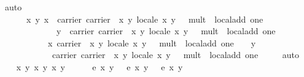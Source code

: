 \begin{isabellebody}
\ auto\isacommand{{\isacharbraceright}}\isamarkupfalse%
\isanewline
\ \ \isamarkupfalse%
\ \isamarkupfalse%
\ {\isachardoublequoteopen}\isanewline
\ \ \ \ \ \ {\isasymAnd}x\ y{\isachardot}\ x\ {\isasymin}\ carrier\ {\isasymlparr}carrier\ {\isacharequal}\ {\isacharbraceleft}{\isacharparenleft}x{\isacharcomma}\ y{\isacharparenright}{\isachardot}\ local{\isachardot}e\ x\ y\ {\isacharequal}\ {}{\isacharbraceright}{\isacharcomma}\ mult\ {\isacharequal}\ local{\isachardot}add{\isacharcomma}\ one\ {\isacharequal}\ {\isacharparenleft}{}{\isacharcomma}\ {}{\isacharparenright}{\isasymrparr}\ {\isasymLongrightarrow}\isanewline
\ \ \ \ \ \ \ \ \ \ \ \ \ y\ {\isasymin}\ carrier\ {\isasymlparr}carrier\ {\isacharequal}\ {\isacharbraceleft}{\isacharparenleft}x{\isacharcomma}\ y{\isacharparenright}{\isachardot}\ local{\isachardot}e\ x\ y\ {\isacharequal}\ {}{\isacharbraceright}{\isacharcomma}\ mult\ {\isacharequal}\ local{\isachardot}add{\isacharcomma}\ one\ {\isacharequal}\ {\isacharparenleft}{}{\isacharcomma}\ {}{\isacharparenright}{\isasymrparr}\ {\isasymLongrightarrow}\isanewline
\ \ \ \ \ \ \ \ \ \ \ x\ {\isasymotimes}\isactrlbsub {\isasymlparr}carrier\ {\isacharequal}\ {\isacharbraceleft}{\isacharparenleft}x{\isacharcomma}\ y{\isacharparenright}{\isachardot}\ local{\isachardot}e\ x\ y\ {\isacharequal}\ {}{\isacharbraceright}{\isacharcomma}\ mult\ {\isacharequal}\ local{\isachardot}add{\isacharcomma}\ one\ {\isacharequal}\ {\isacharparenleft}{}{\isacharcomma}\ {}{\isacharparenright}{\isasymrparr}\isactrlesub \ y\isanewline
\ \ \ \ \ \ \ \ \ \ \ {\isasymin}\ carrier\ {\isasymlparr}carrier\ {\isacharequal}\ {\isacharbraceleft}{\isacharparenleft}x{\isacharcomma}\ y{\isacharparenright}{\isachardot}\ local{\isachardot}e\ x\ y\ {\isacharequal}\ {}{\isacharbraceright}{\isacharcomma}\ mult\ {\isacharequal}\ local{\isachardot}add{\isacharcomma}\ one\ {\isacharequal}\ {\isacharparenleft}{}{\isacharcomma}\ {}{\isacharparenright}{\isasymrparr}{\isachardoublequoteclose}\ \isamarkupfalse%
\ auto\isanewline
{}\isamarkupfalse%
\isanewline
\ \ \isacommand{{\isacharbraceleft}}\isamarkupfalse%
\isamarkupfalse%
\ x{}\ y{}\ x{}\ y{}\ x{}\ y{}\ \isanewline
\ \ \ \isamarkupfalse%
\ {\isachardoublequoteopen}e\ x{}\ y{}\ {\isacharequal}\ {}{\isachardoublequoteclose}\ {\isachardoublequoteopen}e\ x{}\ y{}\ {\isacharequal}\ {}{\isachardoublequoteclose}\ {\isachardoublequoteopen}e\ x{}\ y{}\ {\isacharequal}\ {}{\isachardoublequoteclose}\ \isanewline

\end{isabellebody}
